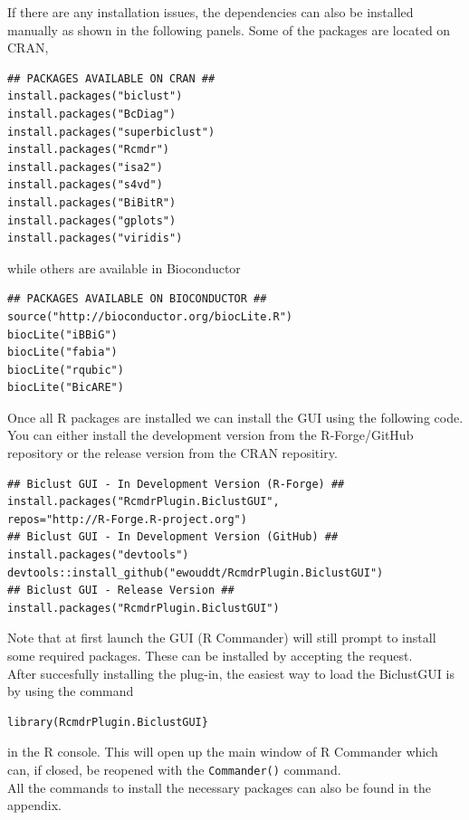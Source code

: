 \documentclass[a4paper]{article}\usepackage[]{graphicx}\usepackage[]{color}
\begin{document}
\noindent If there are any installation issues, the dependencies can also be
installed manually as shown in the following panels.
Some of the packages are located on CRAN,
\begin{verbatim}
## PACKAGES AVAILABLE ON CRAN ##
install.packages("biclust")
install.packages("BcDiag")
install.packages("superbiclust")
install.packages("Rcmdr")
install.packages("isa2")
install.packages("s4vd")
install.packages("BiBitR")
install.packages("gplots")
install.packages("viridis")
\end{verbatim}
\noindent while others are available in Bioconductor
\begin{verbatim}
## PACKAGES AVAILABLE ON BIOCONDUCTOR ##
source("http://bioconductor.org/biocLite.R")
biocLite("iBBiG")
biocLite("fabia")
biocLite("rqubic")
biocLite("BicARE")
\end{verbatim}
\noindent Once all R packages are installed we can install the GUI using the following
code. You can either install the development version from the R-Forge/GitHub repository
or the release version from the CRAN repositiry.
\begin{verbatim}
## Biclust GUI - In Development Version (R-Forge) ##
install.packages("RcmdrPlugin.BiclustGUI",
repos="http://R-Forge.R-project.org")
## Biclust GUI - In Development Version (GitHub) ##
install.packages("devtools") 
devtools::install_github("ewouddt/RcmdrPlugin.BiclustGUI")
## Biclust GUI - Release Version ##
install.packages("RcmdrPlugin.BiclustGUI")
\end{verbatim}
Note that at first launch the GUI (R Commander) will still prompt to install
some required packages. These can be installed by accepting the request.\\
\noindent After succesfully installing the plug-in, the easiest way to load the
BiclustGUI is by using the command
\begin{verbatim}
library(RcmdrPlugin.BiclustGUI}
\end{verbatim}
in the R console. This will open up the main window of R Commander which can, if
closed, be reopened with the \verb|Commander()| command. \\
\noindent All the commands to install the necessary packages can also be found
in the appendix.
\end{document}
